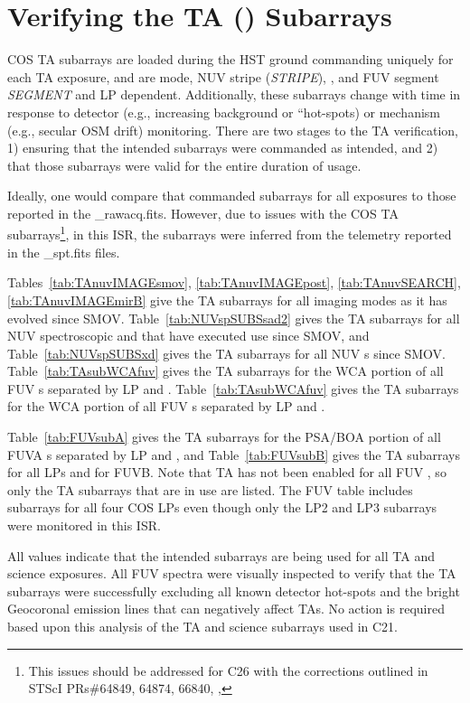 \section{Verifying the TA (\tacq{}) Subarrays}\label{sec:subarray}

COS TA subarrays are loaded during the HST ground commanding uniquely for each TA exposure,
and are \tacq{} mode, NUV stripe (\textit{STRIPE}), \cenwave, and FUV segment \textit{SEGMENT} and LP dependent.
Additionally, these subarrays change with time in response to detector (e.g., increasing background or ``hot-spots)
or mechanism (e.g., secular OSM drift) monitoring.
There are two stages to the TA verification,
1) ensuring that the intended subarrays were commanded as intended, and
2) that those subarrays were valid for the entire duration of usage.

Ideally, one would compare that commanded subarrays for all exposures to those reported in the \textsf{\_rawacq.fits}.
However, due to issues with the COS TA subarrays\footnote{This issues should be addressed for C26 with the corrections outlined in STScI PRs\#64849, 64874, 66840, , },
in this ISR, the subarrays were inferred from the telemetry reported in the \textsf{\_spt.fits} files.

Tables~\ref{tab:TAnuvIMAGEsmov}, \ref{tab:TAnuvIMAGEpost}, \ref{tab:TAnuvSEARCH}, \ref{tab:TAnuvIMAGEmirB} give the TA subarrays for all imaging modes
as it has evolved since SMOV.
Table~\ref{tab:NUVspSUBSsad2} gives the TA subarrays for all NUV spectroscopic  and  that have executed use since SMOV, and
Table~\ref{tab:NUVspSUBSxd} gives the TA subarrays for all NUV s since SMOV.
Table~\ref{tab:TAsubWCAfuv} gives the TA subarrays for the WCA portion of all FUV s separated by LP and \cenwave.
Table~\ref{tab:TAsubWCAfuv} gives the TA subarrays for the WCA portion of all FUV s separated by LP and \cenwave.

Table~\ref{tab:FUVsubA} gives the TA subarrays for the PSA/BOA portion of all FUVA \tacq{}s separated by LP and \cenwave,
and Table~\ref{tab:FUVsubB} gives the TA subarrays for all LPs and \cenwaves for FUVB.
Note that TA has not been enabled for all FUV \cenwaves, so only the TA subarrays that are in use are listed.
The FUV table includes subarrays for all four COS LPs even though only the LP2 and LP3 subarrays were monitored in this ISR.

All values indicate that the intended subarrays are being used for all TA and science exposures. All FUV spectra were visually
inspected to verify that the TA subarrays were successfully excluding all known detector hot-spots and the
bright Geocoronal emission lines that can negatively affect TAs.  No action is required based upon this
analysis of the TA and science subarrays used in C21.


